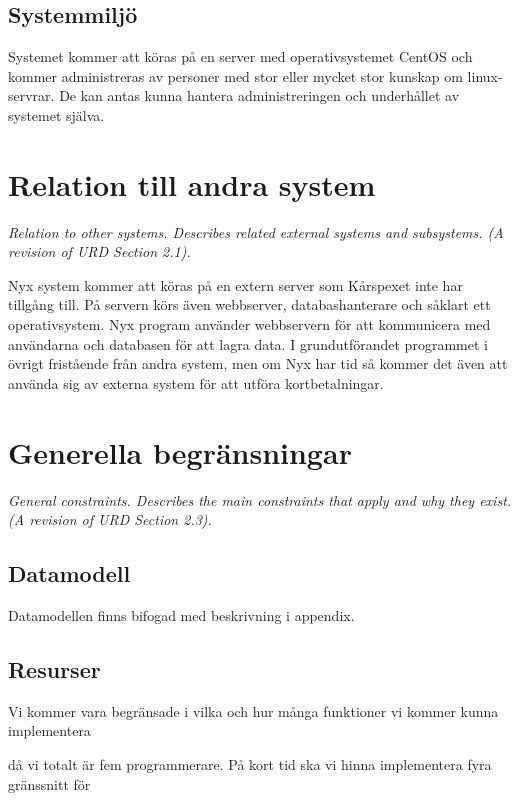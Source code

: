 \documentclass[a4paper, twoside, 11pt, titlepage]{article}
\begin{document}
	\subsection{Systemmiljö}


	Systemet kommer att köras på en server med operativsystemet CentOS och kommer administreras av personer med stor eller mycket stor kunskap om linux-servrar. De kan antas kunna hantera administreringen och underhållet av systemet själva.

\clearpage
\section{Relation till andra system}


\emph{Relation to other systems. Describes related external systems and subsystems. (A revision of URD Section 2.1).}

Nyx system kommer att köras på en extern server som Kårspexet inte har tillgång till. På servern körs även webbserver, databashanterare och såklart ett operativsystem. Nyx program använder webbservern för att kommunicera med användarna och databasen för att lagra data. I grundutförandet programmet i övrigt fristående från andra system, men om Nyx har tid så kommer det även att använda sig av externa system för att utföra kortbetalningar.

\clearpage
\section{Generella begränsningar}


\emph{General constraints. Describes the main constraints that apply and why they exist. (A revision of URD Section 2.3).}

	\subsection{Datamodell}


	Datamodellen finns bifogad med beskrivning i appendix.

	\subsection{Resurser}


	Vi kommer vara begränsade i vilka och hur många funktioner vi kommer kunna implementera

	då vi totalt är fem programmerare. På kort tid ska vi hinna implementera fyra gränssnitt för
\end{document}
